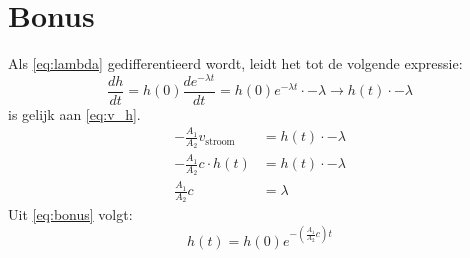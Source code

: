 \documentclass{scrartcl}
\begin{document}
\newpage
\section{Bonus}
Als \cref{eq:lambda} gedifferentieerd wordt, leidt het tot de volgende expressie:
    \begin{equation}\label{eq:h_t_afgeleide_exp}
        \frac{dh}{dt} = h(0)\frac{de^{-\lambda t}}{dt} = h(0)e^{-\lambda t}\cdot-\lambda \rightarrow h(t)\cdot-\lambda
    \end{equation}
     is gelijk aan \cref{eq:v_h}.
    \begin{equation}\label{eq:bonus}
        \begin{split}
            -\frac{A_1}{A_2}v_{\text{stroom}} &= h(t)\cdot-\lambda\\
            -\frac{A_1}{A_2}c\cdot h(t) &= h(t)\cdot-\lambda\\
            \frac{A_1}{A_2}c &= \lambda
        \end{split}
    \end{equation}
    Uit \cref{eq:bonus} volgt:
    \begin{equation*}
        h(t) = h(0)e^{-\left(\frac{A_1}{A_2}c\right)t}
    \end{equation*}
    
\end{document}
